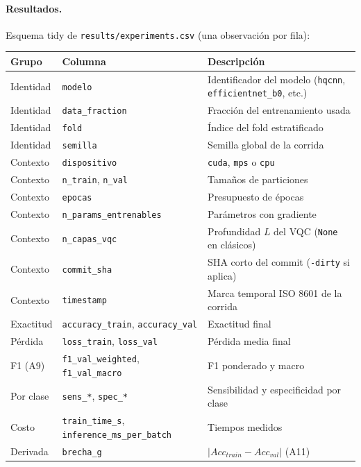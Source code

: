 \paragraph{Resultados.}
Esquema tidy de \texttt{results/experiments.csv} (una observación por fila):

\begin{center}
\small
\begin{tabular}{llp{7.5cm}}\hline
\textbf{Grupo} & \textbf{Columna} & \textbf{Descripción} \\\hline
Identidad & \texttt{modelo} & Identificador del modelo (\texttt{hqcnn}, \texttt{efficientnet\_b0}, etc.) \\
Identidad & \texttt{data\_fraction} & Fracción del entrenamiento usada \\
Identidad & \texttt{fold} & Índice del fold estratificado \\
Identidad & \texttt{semilla} & Semilla global de la corrida \\\hline
Contexto & \texttt{dispositivo} & \texttt{cuda}, \texttt{mps} o \texttt{cpu} \\
Contexto & \texttt{n\_train}, \texttt{n\_val} & Tamaños de particiones \\
Contexto & \texttt{epocas} & Presupuesto de épocas \\
Contexto & \texttt{n\_params\_entrenables} & Parámetros con gradiente \\
Contexto & \texttt{n\_capas\_vqc} & Profundidad $L$ del VQC (\texttt{None} en clásicos) \\
Contexto & \texttt{commit\_sha} & SHA corto del commit (\texttt{-dirty} si aplica) \\
Contexto & \texttt{timestamp} & Marca temporal ISO 8601 de la corrida \\\hline
Exactitud & \texttt{accuracy\_train}, \texttt{accuracy\_val} & Exactitud final \\
Pérdida & \texttt{loss\_train}, \texttt{loss\_val} & Pérdida media final \\
F1 (A9) & \texttt{f1\_val\_weighted}, \texttt{f1\_val\_macro} & F1 ponderado y macro \\
Por clase & \texttt{sens\_*}, \texttt{spec\_*} & Sensibilidad y especificidad por clase \\
Costo & \texttt{train\_time\_s}, \texttt{inference\_ms\_per\_batch} & Tiempos medidos \\
Derivada & \texttt{brecha\_g} & $|Acc_{train} - Acc_{val}|$ (A11) \\\hline
\end{tabular}
\end{center}

